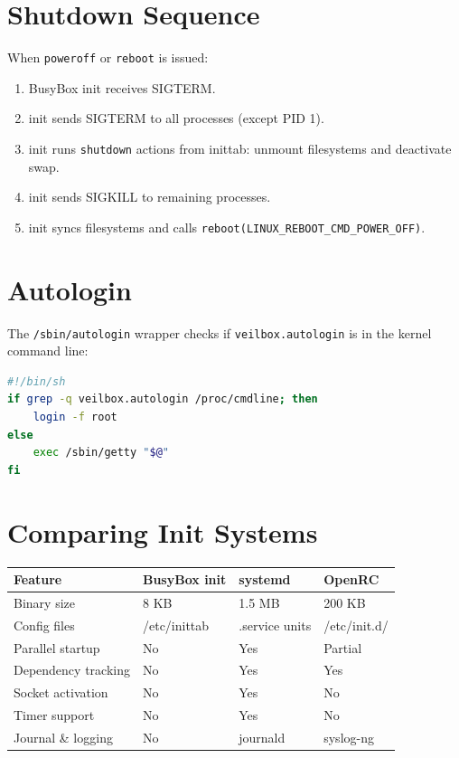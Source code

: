 \section{Shutdown Sequence}

When \texttt{poweroff} or \texttt{reboot} is issued:

\begin{enumerate}[nosep]
  \item BusyBox init receives SIGTERM.
  \item init sends SIGTERM to all processes (except PID 1).
  \item init runs \texttt{shutdown} actions from inittab: unmount
        filesystems and deactivate swap.
  \item init sends SIGKILL to remaining processes.
  \item init syncs filesystems and calls \texttt{reboot(LINUX\_REBOOT\_CMD\_POWER\_OFF)}.
\end{enumerate}

\section{Autologin}

The \texttt{/sbin/autologin} wrapper checks if \texttt{veilbox.autologin}
is in the kernel command line:

\begin{lstlisting}[language=bash]
#!/bin/sh
if grep -q veilbox.autologin /proc/cmdline; then
    login -f root
else
    exec /sbin/getty "$@"
fi
\end{lstlisting}

\section{Comparing Init Systems}

\begin{longtable}{|p{3cm}|p{3.5cm}|p{3.5cm}|p{3.5cm}|}
\hline
\textbf{Feature} & \textbf{BusyBox init} & \textbf{systemd} & \textbf{OpenRC} \\
\hline
Binary size & 8 KB & 1.5 MB & 200 KB \\
Config files & /etc/inittab & .service units & /etc/init.d/ \\
Parallel startup & No & Yes & Partial \\
Dependency tracking & No & Yes & Yes \\
Socket activation & No & Yes & No \\
Timer support & No & Yes & No \\
Journal \& logging & No & journald & syslog-ng \\
\hline
\end{longtable}

